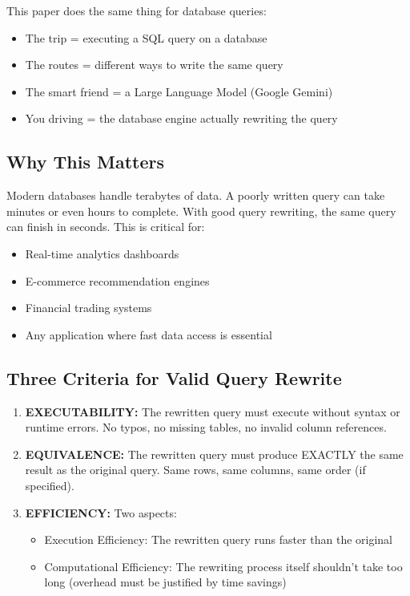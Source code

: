 \documentclass[12pt,a4paper]{article}
\begin{document}
This paper does the same thing for database queries:
\begin{itemize}
    \item The trip = executing a SQL query on a database
    \item The routes = different ways to write the same query
    \item The smart friend = a Large Language Model (Google Gemini)
    \item You driving = the database engine actually rewriting the query
\end{itemize}

\subsection{Why This Matters}
Modern databases handle terabytes of data. A poorly written query can take minutes or even hours to complete. With good query rewriting, the same query can finish in seconds. This is critical for:
\begin{itemize}
    \item Real-time analytics dashboards
    \item E-commerce recommendation engines
    \item Financial trading systems
    \item Any application where fast data access is essential
\end{itemize}

\subsection{Three Criteria for Valid Query Rewrite}
\begin{enumerate}
    \item \textbf{EXECUTABILITY:} The rewritten query must execute without syntax or runtime errors. No typos, no missing tables, no invalid column references.
    \item \textbf{EQUIVALENCE:} The rewritten query must produce EXACTLY the same result as the original query. Same rows, same columns, same order (if specified).
    \item \textbf{EFFICIENCY:} Two aspects:
    \begin{itemize}
        \item Execution Efficiency: The rewritten query runs faster than the original
        \item Computational Efficiency: The rewriting process itself shouldn't take too long (overhead must be justified by time savings)
    \end{itemize}
\end{enumerate}
\end{document}
